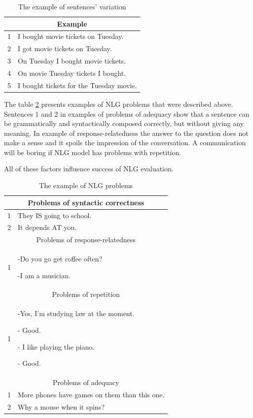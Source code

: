 \begin{table}[t]
\centering
 \begin{tabular}{|p{0.5cm}|p{8cm}|} 
 \hline
 \multicolumn{2}{|c|}{Example} \\
 \hline
 1 & I bought movie tickets on Tuesday. \\ 
 \hline
 2 & I got movie tickets on Tuesday. \\
 \hline
 3 & On Tuesday I bought movie tickets. \\
 \hline
 4 & On movie Tuesday tickets I bought. \\
 \hline
 5 & I bought tickets for the Tuesday movie. \\ 
 \hline
 \end{tabular}
 \caption{The example of sentences' variation}
\label{tab:var_example}
\end{table}

The table \ref{tab:nlg_problems_example} presents examples of NLG problems that were described above. Sentences 1 and 2 in examples of problems of adequacy show that a sentence can be grammatically and syntactically composed correctly, but without giving any meaning. In example of response-relatedness the answer to the question does not make a sense and it spoils the impression of the conversation. A communication will be boring if NLG model has problems with repetition.

All of these factors influence success of NLG evaluation.  

\begin{table}[t]
\centering
 \begin{tabular}{|p{0.5cm}|p{8cm}|} 
 \hline
 \multicolumn{2}{|c|}{Problems of syntactic correctness} \\
 \hline
 1 & They IS going to school. \\ 
 \hline
 2 & It depends AT you. \\
 \hline
 \multicolumn{2}{|c|}{Problems of response-relatedness} \\
 \hline
 1 & -Do you go get coffee often? 

    -I am a musician. \\
 \hline
 \multicolumn{2}{|c|}{Problems of repetition} \\
 \hline
 1 & -Yes, I'm studying law at the moment.

     - Good.

     - I like playing the piano.

     - Good. \\
 \hline
 \multicolumn{2}{|c|}{Problems of adequacy} \\
 \hline
 1 & More phones have games on them than this one. \\
 \hline
 2 & Why a mouse when it spins? \\
 \hline
 \end{tabular}
 \caption{The example of NLG problems}
\label{tab:nlg_problems_example}
\end{table}


